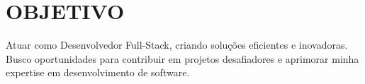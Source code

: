 \section{OBJETIVO}
Atuar como Desenvolvedor Full-Stack, criando soluções eficientes e inovadoras. Busco oportunidades para contribuir em projetos desafiadores e aprimorar minha expertise em desenvolvimento de software. 

